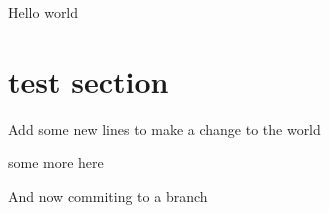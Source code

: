 \documentclass{article}
\begin{document}
	Hello world
	
	\section{test section}
	
	Add some new lines to make a change to the world
	
	some more here
 
 And now commiting to a branch
\end{document}
